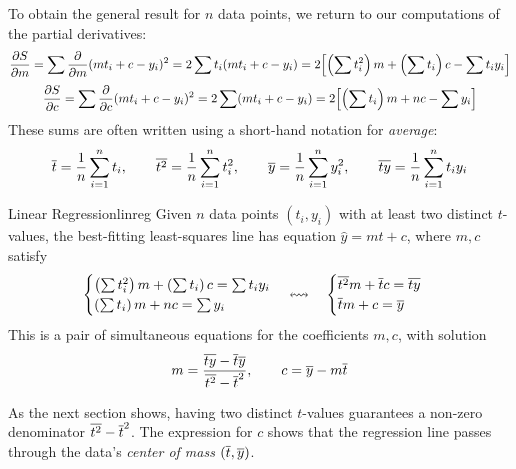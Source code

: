 \goodbreak

To obtain the general result for $n$ data points, we return to our computations of the partial derivatives:
\begin{gather*}
	\partials[S]{m}=\sum\partials{m}(mt_i+c-y_i)^2 =2\sum t_i(mt_i+c-y_i) =2\Bigl[\left(\sum t_i^2\right)m+\left(\sum t_i\right)c-\sum t_iy_i\Bigr]\\[3pt]
	\partials[S]{c}=\sum\partials{c}(mt_i+c-y_i)^2 =2\sum (mt_i+c-y_i) =2\Bigl[\left(\sum t_i\right)m+nc-\sum y_i\Bigr]
\end{gather*}
These sums are often written using a short-hand notation for \emph{average}:
\[
	\cl t=\frac 1n\sum_{i=1}^nt_i,\qquad \cl{t^2}=\frac 1n\sum_{i=1}^nt_i^2,\qquad \cl{y}=\frac 1n\sum_{i=1}^ny_i^2,\qquad \cl{ty}=\frac 1n\sum_{i=1}^nt_iy_i
\]

\begin{thm}{Linear Regression}{linreg}
	Given $n$ data points $(t_i,y_i)$ with at least two distinct $t$-values, the best-fitting least-squares line has equation $\hat y=mt+c$, where $m,c$ satisfy
	\[
		\begin{cases}
			\left(\sum t_i^2\right)m+\left(\sum t_i\right)c=\sum t_iy_i\\
			\left(\sum t_i\right)m+nc=\sum y_i
		\end{cases}
		\leftrightsquigarrow \quad
		\begin{cases}
			\cl{t^2}m+\cl tc=\cl{ty}\\
			\cl tm+c=\cl y\\
		\end{cases}
	\]
	This is a pair of simultaneous equations for the coefficients $m,c$, with solution
	\[
		m=\frac{\cl{ty}-\cl t \cl y}{\cl{t^2}-\cl t^2},\qquad c=\cl y-m\cl t
	\]
\end{thm}

As the next section shows, having two distinct $t$-values guarantees a non-zero denominator $\cl{t^2}-\cl t^2$. The expression for $c$ shows that the regression line passes through the data's \emph{center of mass} $(\cl t,\cl y)$.



